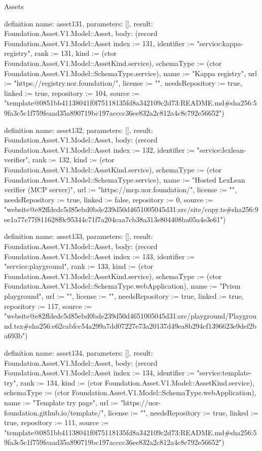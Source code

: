 \begin{lexlean}{Assets}
\begin{semanticmodule}
definition{
  name: asset131,
  parameters: [],
  result: Foundation.Asset.V1.Model::Asset,
  body: (record Foundation.Asset.V1.Model::Asset {index := 131, identifier := "service:kappa-registry", rank := 131, kind := (ctor Foundation.Asset.V1.Model::AssetKind.service), schemaType := (ctor Foundation.Asset.V1.Model::SchemaType.service), name := "Kappa registry", url := "https://registry.uor.foundation/", license := "", needsRepository := true, linked := true, repository := 104, source := "template@0851bb41138041f0f75118135fd8a342109c2d73:README.md#sha256:59fa3c5c1f759feaad35a890719bc197acccc36ee832a2c812a4c8c792e56652"})
}

definition{
  name: asset132,
  parameters: [],
  result: Foundation.Asset.V1.Model::Asset,
  body: (record Foundation.Asset.V1.Model::Asset {index := 132, identifier := "service:lexlean-verifier", rank := 132, kind := (ctor Foundation.Asset.V1.Model::AssetKind.service), schemaType := (ctor Foundation.Asset.V1.Model::SchemaType.service), name := "Hosted LexLean verifier (MCP server)", url := "https://mcp.uor.foundation/", license := "", needsRepository := true, linked := false, repository := 0, source := "website@e82ffdedc5d85ebd0bde239d50d4651005045d31:src/site/copy.ts#sha256:9ee1a77e77f811628f0c95344c71f7a204caa7cb38a313e804408ba05a4e3e61"})
}

definition{
  name: asset133,
  parameters: [],
  result: Foundation.Asset.V1.Model::Asset,
  body: (record Foundation.Asset.V1.Model::Asset {index := 133, identifier := "service:playground", rank := 133, kind := (ctor Foundation.Asset.V1.Model::AssetKind.service), schemaType := (ctor Foundation.Asset.V1.Model::SchemaType.webApplication), name := "Prism playground", url := "", license := "", needsRepository := true, linked := true, repository := 117, source := "website@e82ffdedc5d85ebd0bde239d50d4651005045d31:src/playground/Playground.tsx#sha256:e62cabfcc54a299a7dd07227e73a20137d49ea8b294cf1396623e9def2ba693b"})
}

definition{
  name: asset134,
  parameters: [],
  result: Foundation.Asset.V1.Model::Asset,
  body: (record Foundation.Asset.V1.Model::Asset {index := 134, identifier := "service:template-try", rank := 134, kind := (ctor Foundation.Asset.V1.Model::AssetKind.service), schemaType := (ctor Foundation.Asset.V1.Model::SchemaType.webApplication), name := "Template try page", url := "https://uor-foundation.github.io/template/", license := "", needsRepository := true, linked := true, repository := 111, source := "template@0851bb41138041f0f75118135fd8a342109c2d73:README.md#sha256:59fa3c5c1f759feaad35a890719bc197acccc36ee832a2c812a4c8c792e56652"})
}


\end{semanticmodule}
\end{lexlean}

